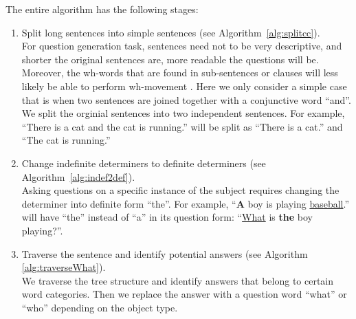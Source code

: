 The entire algorithm has the following stages:
\begin{enumerate}
\item Split long sentences into simple sentences (see Algorithm~\ref{alg:splitcc}). \\
For question generation task, sentences need not to be very descriptive, and shorter the original sentences are, more readable the questions will be. Moreover, the wh-words that are found in sub-sentences or clauses will less likely be able to perform wh-movement \cite{borsley99}. Here we only consider a simple case that is when two sentences are joined together with a conjunctive word ``and''. We split the orginial sentences into two independent sentences.
 For example, ``There is a cat and the cat is running.'' will be split as ``There is a cat.'' and ``The cat is running.''
\item Change indefinite determiners to definite determiners (see Algorithm~\ref{alg:indef2def}).\\
Asking questions on a specific instance of the subject requires changing the determiner into definite form ``the''. For example, ``\textbf{A} boy is playing \underline{baseball}.'' will have ``the'' instead of ``a'' in its question form: ``\underline{What} is \textbf{the} boy playing?''.

\item Traverse the sentence and identify potential answers (see Algorithm \ref{alg:traverseWhat}). \\
We traverse the tree structure and identify answers that belong to certain word categories. Then we replace the answer with a question word ``what'' or ``who'' depending on the object type.


\end{enumerate}
